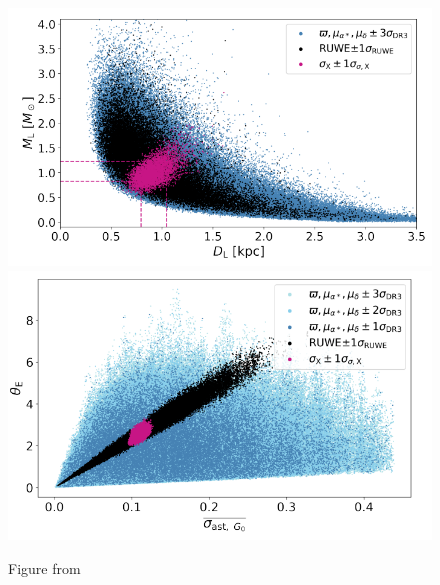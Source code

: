 \documentclass[twocolumn]{aastex631}
\begin{document}
\begin{figure}
	\includegraphics[width=\columnwidth]{microlensingsimMD.png}
	\includegraphics[width=\columnwidth]{microlensingsimTheta.png}
	\caption{Figure from \cite{jablonskaThere2022}}
\end{figure}


{}



\end{document}
